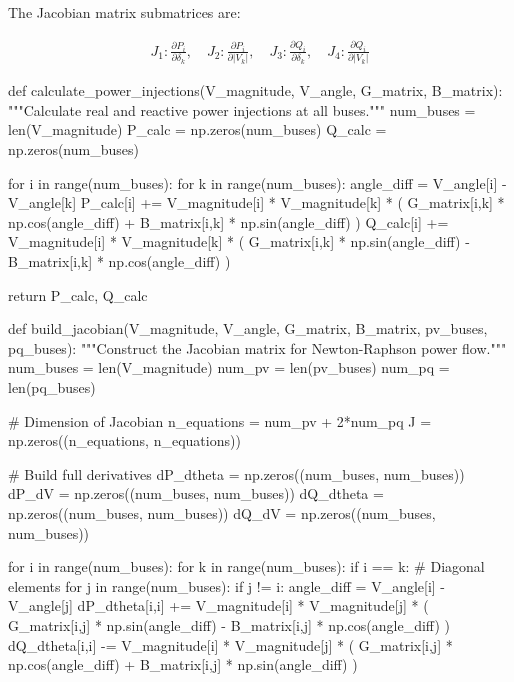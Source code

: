 \documentclass[11pt,a4paper]{article}
\begin{document}
The Jacobian matrix submatrices are:

\begin{align}
J_1: \frac{\partial P_i}{\partial \delta_k}, \quad
J_2: \frac{\partial P_i}{\partial |V_k|}, \quad
J_3: \frac{\partial Q_i}{\partial \delta_k}, \quad
J_4: \frac{\partial Q_i}{\partial |V_k|}
\end{align}

\begin{pycode}
def calculate_power_injections(V_magnitude, V_angle, G_matrix, B_matrix):
    """Calculate real and reactive power injections at all buses."""
    num_buses = len(V_magnitude)
    P_calc = np.zeros(num_buses)
    Q_calc = np.zeros(num_buses)

    for i in range(num_buses):
        for k in range(num_buses):
            angle_diff = V_angle[i] - V_angle[k]
            P_calc[i] += V_magnitude[i] * V_magnitude[k] * (
                G_matrix[i,k] * np.cos(angle_diff) +
                B_matrix[i,k] * np.sin(angle_diff)
            )
            Q_calc[i] += V_magnitude[i] * V_magnitude[k] * (
                G_matrix[i,k] * np.sin(angle_diff) -
                B_matrix[i,k] * np.cos(angle_diff)
            )

    return P_calc, Q_calc

def build_jacobian(V_magnitude, V_angle, G_matrix, B_matrix, pv_buses, pq_buses):
    """Construct the Jacobian matrix for Newton-Raphson power flow."""
    num_buses = len(V_magnitude)
    num_pv = len(pv_buses)
    num_pq = len(pq_buses)

    # Dimension of Jacobian
    n_equations = num_pv + 2*num_pq
    J = np.zeros((n_equations, n_equations))

    # Build full derivatives
    dP_dtheta = np.zeros((num_buses, num_buses))
    dP_dV = np.zeros((num_buses, num_buses))
    dQ_dtheta = np.zeros((num_buses, num_buses))
    dQ_dV = np.zeros((num_buses, num_buses))

    for i in range(num_buses):
        for k in range(num_buses):
            if i == k:
                # Diagonal elements
                for j in range(num_buses):
                    if j != i:
                        angle_diff = V_angle[i] - V_angle[j]
                        dP_dtheta[i,i] += V_magnitude[i] * V_magnitude[j] * (
                            G_matrix[i,j] * np.sin(angle_diff) -
                            B_matrix[i,j] * np.cos(angle_diff)
                        )
                        dQ_dtheta[i,i] -= V_magnitude[i] * V_magnitude[j] * (
                            G_matrix[i,j] * np.cos(angle_diff) +
                            B_matrix[i,j] * np.sin(angle_diff)
                        )


\end{pycode}
\end{document}
